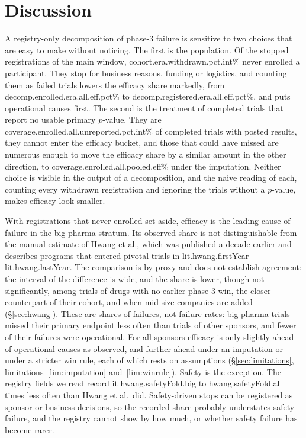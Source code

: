 \documentclass[11pt]{article}
\begin{document}
\section{Discussion}\label{sec:discussion}
A registry-only decomposition of phase-3 failure is sensitive to two choices that are easy to make without noticing. The first is the population. Of the stopped registrations of the main window, \num{cohort.era.withdrawn.pct.int}\% never enrolled a participant. They stop for business reasons, funding or logistics, and counting them as failed trials lowers the efficacy share markedly, from \num{decomp.enrolled.era.all.eff.pct}\% to \num{decomp.registered.era.all.eff.pct}\%, and puts operational causes first. The second is the treatment of completed trials that report no usable primary $p$-value. They are \num{coverage.enrolled.all.unreported.pct.int}\% of completed trials with posted results, they cannot enter the efficacy bucket, and those that could have missed are numerous enough to move the efficacy share by a similar amount in the other direction, to \num{coverage.enrolled.all.pooled.eff}\% under the imputation. Neither choice is visible in the output of a decomposition, and the naive reading of each, counting every withdrawn registration and ignoring the trials without a $p$-value, makes efficacy look smaller.

With registrations that never enrolled set aside, efficacy is the leading cause of failure in the big-pharma stratum. Its observed share is not distinguishable from the manual estimate of Hwang et al., which was published a decade earlier and describes programs that entered pivotal trials in \num{lit.hwang.firstYear}--\num{lit.hwang.lastYear}. The comparison is by proxy and does not establish agreement: the interval of the difference is wide, and the share is lower, though not significantly, among trials of drugs with no earlier phase-3 win, the closer counterpart of their cohort, and when mid-size companies are added (\S\ref{sec:hwang}). These are shares of failures, not failure rates: big-pharma trials missed their primary endpoint less often than trials of other sponsors, and fewer of their failures were operational. For all sponsors efficacy is only slightly ahead of operational causes as observed, and further ahead under an imputation or under a stricter win rule, each of which rests on assumptions (\S\ref{sec:limitations}, limitations~\ref{lim:imputation} and~\ref{lim:winrule}). Safety is the exception. The registry fields we read record it \num{hwang.safetyFold.big} to \num{hwang.safetyFold.all} times less often than Hwang et al.\ did. Safety-driven stops can be registered as sponsor or business decisions, so the recorded share probably understates safety failure, and the registry cannot show by how much, or whether safety failure has become rarer.
\end{document}

